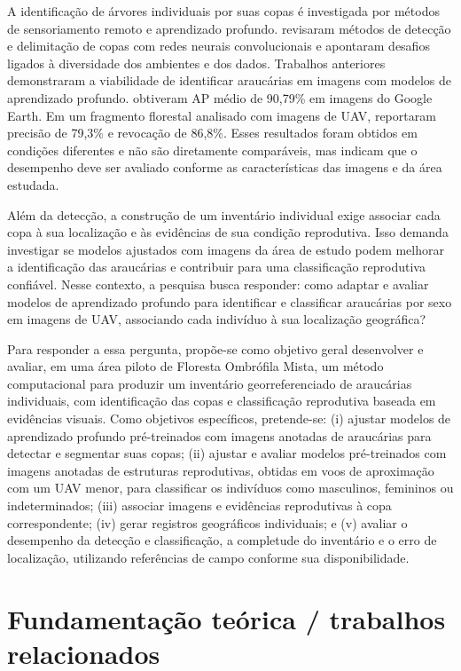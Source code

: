 A identificação de árvores individuais por suas copas é investigada por métodos de sensoriamento remoto e aprendizado profundo. \citet{zhao2023} revisaram métodos de detecção e delimitação de copas com redes neurais convolucionais e apontaram desafios ligados à diversidade dos ambientes e dos dados. Trabalhos anteriores demonstraram a viabilidade de identificar araucárias em imagens com modelos de aprendizado profundo. \citet{karasinski2025} obtiveram AP médio de 90,79\% em imagens do Google Earth. Em um fragmento florestal analisado com imagens de UAV, \citet{correa2024} reportaram precisão de 79,3\% e revocação de 86,8\%. Esses resultados foram obtidos em condições diferentes e não são diretamente comparáveis, mas indicam que o desempenho deve ser avaliado conforme as características das imagens e da área estudada.

Além da detecção, a construção de um inventário individual exige associar cada copa à sua localização e às evidências de sua condição reprodutiva. Isso demanda investigar se modelos ajustados com imagens da área de estudo podem melhorar a identificação das araucárias e contribuir para uma classificação reprodutiva confiável. Nesse contexto, a pesquisa busca responder: como adaptar e avaliar modelos de aprendizado profundo para identificar e classificar araucárias por sexo em imagens de UAV, associando cada indivíduo à sua localização geográfica?

Para responder a essa pergunta, propõe-se como objetivo geral desenvolver e avaliar, em uma área piloto de Floresta Ombrófila Mista, um método computacional para produzir um inventário georreferenciado de araucárias individuais, com identificação das copas e classificação reprodutiva baseada em evidências visuais. Como objetivos específicos, pretende-se: (i) ajustar modelos de aprendizado profundo pré-treinados com imagens anotadas de araucárias para detectar e segmentar suas copas; (ii) ajustar e avaliar modelos pré-treinados com imagens anotadas de estruturas reprodutivas, obtidas em voos de aproximação com um UAV menor, para classificar os indivíduos como masculinos, femininos ou indeterminados; (iii) associar imagens e evidências reprodutivas à copa correspondente; (iv) gerar registros geográficos individuais; e (v) avaliar o desempenho da detecção e classificação, a completude do inventário e o erro de localização, utilizando referências de campo conforme sua disponibilidade.

\section{Fundamentação teórica / trabalhos relacionados}

